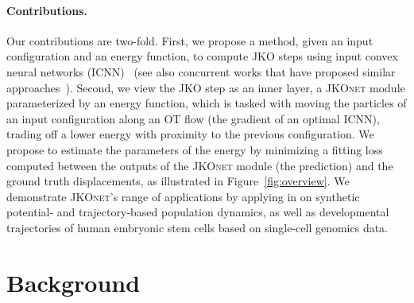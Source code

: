 \paragraph{Contributions.}\hspace{1em} Our contributions are two-fold. First, we propose a method, given an input configuration and an energy function, to compute JKO steps using input convex neural networks (ICNN)~\citep{amos2017input,pmlr-v119-makkuva20a} (see also concurrent works that have proposed similar approaches~\citep{alvarez2021optimizing, mokrov2021large}). Second, we view the JKO step as an inner layer, a \textsc{JKOnet} module parameterized by an energy function, which is tasked with moving the particles of an input configuration along an OT flow (the gradient of an optimal ICNN), trading off a lower energy with proximity to the previous configuration.
We propose to estimate the parameters of the energy by minimizing a fitting loss %
computed between the outputs of the \textsc{JKOnet} module (the prediction) and the ground truth displacements, as illustrated in Figure~\ref{fig:overview}.
We demonstrate \textsc{JKOnet}'s range of applications by applying in on synthetic potential- and trajectory-based population dynamics, as well as developmental trajectories of human embryonic stem cells based on single-cell genomics data.


\section{Background}

